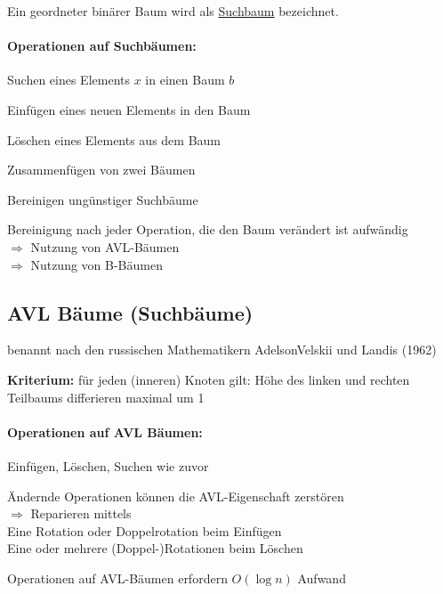 Ein geordneter binärer Baum wird als \ul{Suchbaum} bezeichnet.

\paragraph{Operationen auf Suchbäumen:}
\begin{compactitem}
	\item Suchen eines Elements $x$ in einen Baum $b$
	\item Einfügen eines neuen Elements in den Baum
	\item Löschen eines Elements aus dem Baum
	\item Zusammenfügen von zwei Bäumen
	\item Bereinigen {\flqq ungünstiger\frqq} Suchbäume
\end{compactitem}

Bereinigung nach jeder Operation, die den Baum verändert ist aufwändig\\
$\Rightarrow$ Nutzung von AVL-Bäumen\\
$\Rightarrow$ Nutzung von B-Bäumen

\subsection{AVL Bäume (Suchbäume)}
\begin{compactitem}
	\item benannt nach den russischen Mathematikern AdelsonVelskii und Landis (1962)
	\item {\bf Kriterium:} für jeden (inneren) Knoten gilt: Höhe des linken und rechten Teilbaums differieren maximal um 1
\end{compactitem}

\paragraph{Operationen auf AVL Bäumen:}
\begin{compactitem}
	\item Einfügen, Löschen, Suchen wie zuvor
	\item Ändernde Operationen können die AVL-Eigenschaft zerstören\\
	$\Rightarrow$ Reparieren mittels\\
	Eine Rotation oder Doppelrotation beim Einfügen\\
	Eine oder mehrere (Doppel-)Rotationen beim Löschen
	\item Operationen auf AVL-Bäumen erfordern $O(\log n)$ Aufwand
\end{compactitem}

